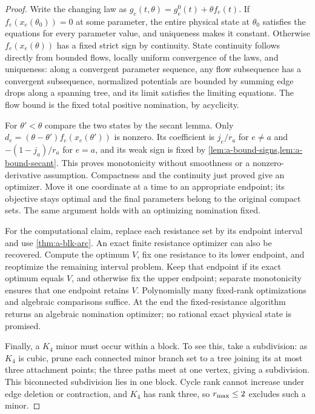 \begin{proof}
Write the changing law as $g_e(t,\theta)=g_e^0(t)+\theta f_e(t)$.
If $f_e(x_e(\theta_0))=0$ at some parameter, the entire physical state
at $\theta_0$ satisfies the equations for every parameter value, and
uniqueness makes it constant. Otherwise $f_e(x_e(\theta))$ has a fixed
strict sign by continuity. State continuity follows directly from bounded flows,
locally uniform convergence of the laws, and uniqueness: along a
convergent parameter sequence, any flow subsequence has a convergent
subsequence, normalized potentials are bounded by summing edge drops along
a spanning tree, and its limit satisfies the limiting equations.
The flow bound is the fixed total positive nomination, by acyclicity.

For $\theta'<\theta$ compare the two states by the secant lemma. Only
$d_e=(\theta-\theta')f_e(x_e(\theta'))$ is nonzero. Its coefficient is
$j_e/r_a$ for $e\ne a$ and $-(1-j_a)/r_a$ for $e=a$, and its weak sign
is fixed by \cref{lem:a-bound-signs,lem:a-bound-secant}. This proves
monotonicity without smoothness or a nonzero-derivative assumption.
Compactness and the continuity just proved give an optimizer. Move it
one coordinate at a time to an appropriate endpoint; its objective
stays optimal and the final parameters belong to the original compact
sets. The same argument holds with an optimizing nomination fixed.

For the computational claim, replace each resistance set by its endpoint
interval and use \cref{thm:a-blk-arc}. An exact finite resistance optimizer
can also be recovered. Compute the optimum $V$, fix one resistance to
its lower endpoint, and reoptimize the remaining interval problem. Keep
that endpoint if its exact optimum equals $V$, and otherwise fix the
upper endpoint; separate monotonicity ensures that one endpoint retains
$V$. Polynomially many fixed-rank optimizations and algebraic comparisons
suffice. At the end the fixed-resistance algorithm returns an algebraic
nomination optimizer; no rational exact physical state is promised.

Finally, a $K_4$ minor must occur within a block. To see this, take a
subdivision: as $K_4$ is cubic, prune each connected
minor branch set to a tree joining its at most three attachment points;
the three paths meet at one vertex, giving a subdivision. This
biconnected subdivision lies in one block. Cycle rank cannot increase
under edge deletion or contraction, and $K_4$ has rank three, so
$r_{\max}\le2$ excludes such a minor.
\end{proof}

